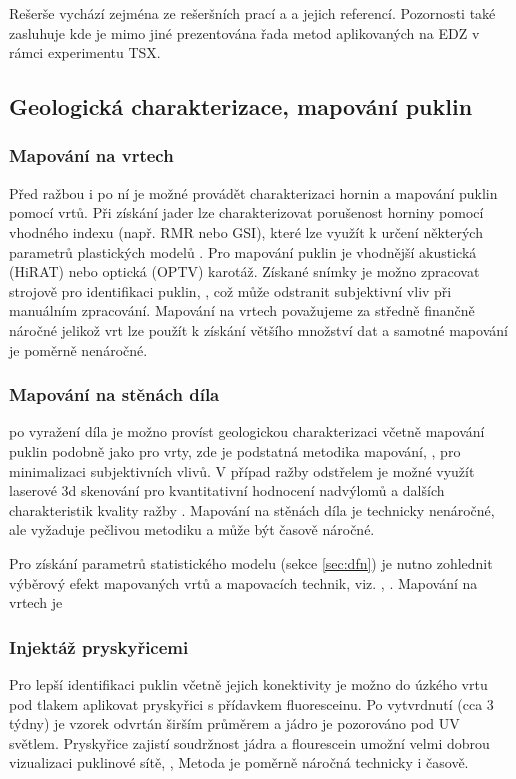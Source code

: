 \documentclass{article}
\begin{document}
Rešerše vychází zejména ze rešeršních prací \cite{Vavro2016} a \cite{Lanyon2011} a jejich referencí. 
Pozornosti také zasluhuje \cite{Chandler2002} kde je mimo jiné prezentována řada metod aplikovaných na EDZ v rámci experimentu TSX.



\subsection{Geologická charakterizace, mapování puklin}
\label{sec:mapovani_puklin}
\subsubsection{Mapování na vrtech}
Před ražbou i po ní je možné provádět charakterizaci hornin a mapování puklin pomocí vrtů. 
Při získání jader lze charakterizovat porušenost horniny pomocí vhodného indexu (např. RMR nebo GSI), 
které lze využít k určení některých parametrů plastických modelů \cite{Hoek2002}. 
Pro mapování puklin je vhodnější akustická (HiRAT) nebo optická (OPTV) karotáž. Získané snímky je možno 
zpracovat strojově pro identifikaci puklin, \cite{Tammisto2002}, což může odstranit subjektivní vliv při manuálním zpracování.
Mapování na vrtech považujeme za středně finančně náročné jelikož vrt lze použít k získání většího množství dat 
a samotné mapování je poměrně nenáročné.

\subsubsection{Mapování na stěnách díla}
po vyražení díla je možno províst geologickou charakterizaci včetně mapování puklin podobně jako pro vrty, 
zde je podstatná metodika mapování, \cite{Bossart2002},  pro minimalizaci subjektivních vlivů. 
V případ ražby odstřelem je možné využít laserové 3d skenování pro kvantitativní hodnocení 
nadvýlomů a dalších charakteristik kvality ražby \cite{Hudson2009a}. 
Mapování na stěnách díla je technicky nenáročné, ale vyžaduje pečlivou metodiku a může být časově náročné.

Pro získání parametrů statistického modelu (sekce \ref{sec:dfn}) je nutno zohlednit výběrový efekt 
mapovaných vrtů a mapovacích technik, viz. \cite{Zetterlund2012}, \cite{Torabi2011}. Mapování na vrtech je 

\subsubsection{Injektáž pryskyřicemi}
Pro lepší identifikaci puklin včetně jejich konektivity je možno do úzkého vrtu pod tlakem aplikovat 
pryskyřici s přídavkem fluoresceinu. Po vytvrdnutí (cca 3 týdny) je vzorek odvrtán širším průměrem a jádro je pozorováno pod UV světlem.
Pryskyřice zajistí soudržnost jádra a flourescein umožní velmi dobrou vizualizaci puklinové sítě, \cite{Bossart2002}, \cite{Lanyon2011}
Metoda je poměrně náročná technicky i časově.
\end{document}
